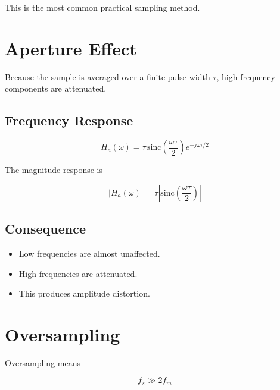 This is the most common practical sampling method.


\section{Aperture Effect}

Because the sample is averaged over a finite pulse width \(\tau\), high-frequency
components are attenuated.


\subsection{Frequency Response}

\[
\boxed{
H_a(\omega)=
\tau\,\mathrm{sinc}\left(\frac{\omega\tau}{2}\right)
e^{-j\omega\tau/2}
}
\]

The magnitude response is

\[
|H_a(\omega)|=
\tau\left|
\mathrm{sinc}\left(\frac{\omega\tau}{2}\right)
\right|
\]


\subsection{Consequence}

\begin{itemize}
\item Low frequencies are almost unaffected.
\item High frequencies are attenuated.
\item This produces amplitude distortion.
\end{itemize}


\section{Oversampling}

Oversampling means

\[
\boxed{
f_s\gg2f_m
}
\]


